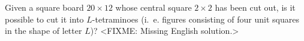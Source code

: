 \problem{}
Given a square board $20 \times 12$ whose central square $2 \times 2$ has been
cut out, is it possible to cut it into $L$-tetraminoes
(i.~e. figures consisting of four unit squares in the shape of letter $L$)?
\solution
<FIXME: Missing English solution.>
\endproblem
